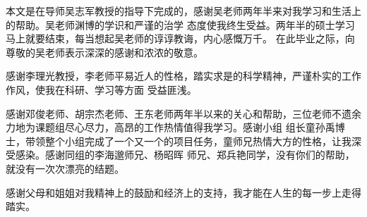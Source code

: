 

\begin{ack}
\fs{}本文是在导师吴志军教授的指导下完成的，感谢吴老师两年半来对我学习和生活上的帮助。吴老师渊博的学识和严谨的治学
态度使我终生受益。两年半的硕士学习马上就要结束，每当想起吴老师的谆谆教诲，内心感慨万千。
在此毕业之际，向尊敬的吴老师表示深深的感谢和浓浓的敬意。\par
感谢李理光教授，李老师平易近人的性格，踏实求是的科学精神，严谨朴实的工作作风，使我在科研、学习等方面
受益匪浅。\par
感谢邓俊老师、胡宗杰老师、王东老师两年半以来的关心和帮助，三位老师不遗余力地为课题组尽心尽力，高昂的工作热情值得我学习。感谢小组
组长童孙禹博士，带领整个小组完成了一个又一个的项目任务，童师兄热情大方的性格，让我深受感染。感谢同组的李海邈师兄、杨昭晖
师兄、郑兵艳同学，没有你们的帮助，就没有一次次漂亮的结题。\par
感谢父母和姐姐对我精神上的鼓励和经济上的支持，我才能在人生的每一步上走得踏实。\song{}
\end{ack}
